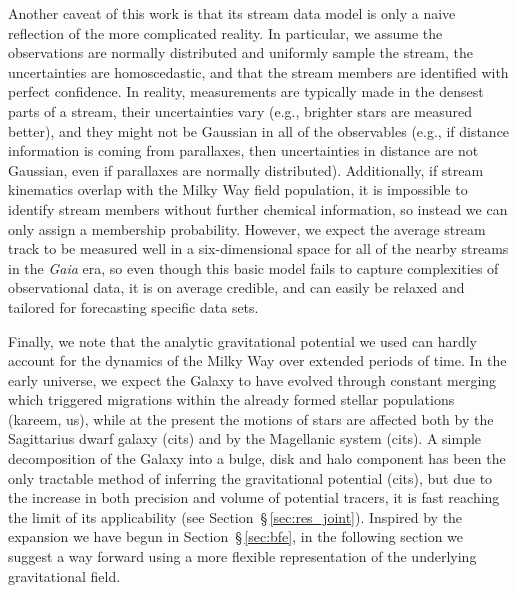 \documentclass[modern]{aastex61}
\begin{document}
Another caveat of this work is that its stream data model is only a naive reflection of the more complicated reality. 
In particular, we assume the observations are normally distributed and uniformly sample the stream, the uncertainties are homoscedastic, and that the stream members are identified with perfect confidence. 
In reality, measurements are typically made in the densest parts of a stream, their uncertainties vary (e.g., brighter stars are measured better), and they might not be Gaussian in all of the observables (e.g., if distance information is coming from parallaxes, then uncertainties in distance are not Gaussian, even if parallaxes are normally distributed).
Additionally, if stream kinematics overlap with the Milky Way field population, it is impossible to identify stream members without further chemical information, so instead we can only assign a membership probability.
However, we expect the average stream track to be measured well in a six-dimensional space for all of the nearby streams in the \emph{Gaia} era, so even though this basic model fails to capture complexities of observational data, it is on average credible, and can easily be relaxed and tailored for forecasting specific data sets.

Finally, we note that the analytic gravitational potential we used can hardly account for the dynamics of the Milky Way over extended periods of time.
In the early universe, we expect the Galaxy to have evolved through constant merging which triggered migrations within the already formed stellar populations (kareem, us), while at the present the motions of stars are affected both by the Sagittarius dwarf galaxy (cits) and by the Magellanic system (cits).
A simple decomposition of the Galaxy into a bulge, disk and halo component has been the only tractable method of inferring the gravitational potential (cits), but due to the increase in both precision and volume of potential tracers, it is fast reaching the limit of its applicability (see Section~\S\,\ref{sec:res_joint}).
Inspired by the expansion we have begun in Section~\S\,\ref{sec:bfe}, in the following section we suggest a way forward using a more flexible representation of the underlying gravitational field.
\end{document}
